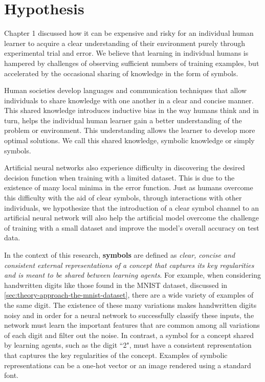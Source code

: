 \section{Hypothesis} \label{sec:theory-hypothesis}

Chapter 1 discussed how it can be expensive and risky for an individual human learner to acquire a clear understanding of their environment purely through experimental trial and error. We believe that learning in individual humans is hampered by challenges of observing sufficient numbers of training examples, but accelerated by the occasional sharing of knowledge in the form of symbols.

Human societies develop languages and communication techniques that allow individuals to share knowledge with one another in a clear and concise manner\cite{DBLP:journals/corr/abs-1203-2990}. This shared knowledge introduces inductive bias in the way humans think and in turn, helps the individual human learner gain a better understanding of the problem or environment\cite{Thrun1998}. This understanding allows the learner to develop more optimal solutions. We call this shared knowledge, symbolic knowledge or simply symbols.

Artificial neural networks also experience difficulty in discovering the desired decision function when training with a limited dataset. This is due to the existence of many local minima in the error function. Just as humans overcome this difficulty with the aid of clear symbols, through interactions with other individuals, we hypothesize that the introduction of a clear symbol channel to an artificial neural network will also help the artificial model overcome the challenge of training with a small dataset and improve the model's overall accuracy on test data.

In the context of this research, \textbf{symbols} are defined as \textit{clear, concise and consistent external representations of a concept that captures its key regularities and is meant to be shared between learning agents}. For example, when considering handwritten digits like those found in the MNIST dataset, discussed in \ref{sec:theory-approach-the-mnist-dataset}, there are a wide variety of examples of the same digit. The existence of these many variations makes handwritten digits noisy and in order for a neural network to successfully classify these inputs, the network must learn the important features that are common among all variations of each digit and filter out the noise. In contrast, a symbol for a concept shared by learning agents, such as the digit ``2", must have a consistent representation that captures the key regularities of the concept. Examples of symbolic representations can be a one-hot vector or an image rendered using a standard font.


